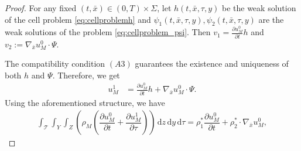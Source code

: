 \documentclass[11pt]{article}
\def\p{\partial}
\def\T{\mathcal{T}}
\newcommand{\di}[1]{\,\mathrm{d}#1}
\newcommand{\B}{\textcolor{orange}}
\begin{document}
\begin{proof}

     For any fixed $(t,\bar x)\in (0,T)\times\Sigma$, let 
     $h(t,\bar x, \tau, y)$ be the weak solution of the cell problem \eqref{eq:cellproblemh}
and $\psi_1(t,\bar x, \tau, y),\psi_2(t,\bar x, \tau, y)$ are the weak solutions of the problem \eqref{eq:cellproblem_psi}. Then $v_1=\frac{\partial u_M^0}{\partial t}h$ and $v_2:=\nabla_{\bar x}u_M^0\cdot \Psi$.
    
    The  compatibility condition $(A3)$ guarantees the existence and uniqueness of both $h$ and $\Psi$. Therefore, we get 
    \begin{align*}
         u_M^1&=\frac{\partial u_M^0}{\partial t}h+\nabla_{\bar x}u_M^0\cdot \Psi.
    \end{align*}
Using the aforementioned structure, we have
    \begin{align*}
        \int_\T\int_{Y}\int_Z\left(\rho_M\left(\dfrac{\partial u_M^0}{\partial t}+ \dfrac{\partial u_M^1}{\partial \tau}\right)\right)\di{z}\di{y}\di{\tau}=\rho_{1}^*\dfrac{\partial u_M^0}{\partial t}+\rho_{2}^*\cdot \nabla_{\bar x}u_M^0,
    \end{align*}


\end{proof}
\end{document}
